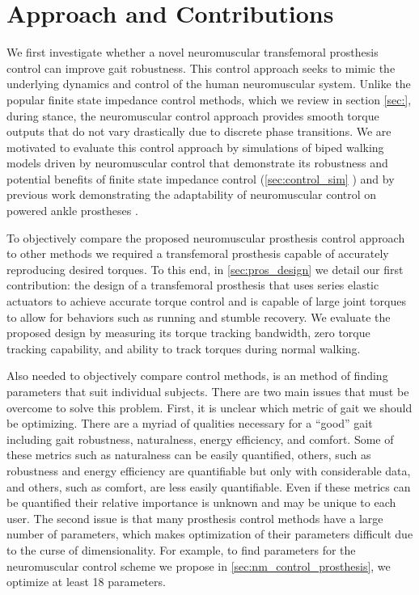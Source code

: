 \section{Approach and Contributions}\label{sec:intro_approach_contrib} 

We first investigate whether a novel neuromuscular transfemoral prosthesis
control can improve gait robustness. This control approach seeks to mimic the
underlying dynamics and control of the human neuromuscular system. Unlike the
popular finite state impedance control methods, which we review in section
\cref{sec:}, during stance, the neuromuscular control approach provides smooth
torque outputs that do not vary drastically due to discrete phase transitions.
We are motivated to evaluate this control approach by simulations of biped
walking models driven by neuromuscular control that demonstrate its robustness
\citep{song2013integration,song2015neural} and potential benefits of finite
state impedance control (\cref{sec:control_sim} \citep{thatte2016toward}) and by
previous work demonstrating the adaptability of neuromuscular control on powered
ankle prostheses \citep{eilenberg2010control,markowitz2011speed}.

To objectively compare the proposed neuromuscular prosthesis control approach to
other methods we required a transfemoral prosthesis capable of accurately
reproducing desired torques. To this end, in \cref{sec:pros_design} we detail
our first contribution: the design of a transfemoral prosthesis that uses series
elastic actuators to achieve accurate torque control and is capable of large
joint torques to allow for behaviors such as running and stumble recovery.  We
evaluate the proposed design by measuring its torque tracking bandwidth, zero
torque tracking capability, and ability to track torques during normal walking.

Also needed to objectively compare control methods, is an method of finding
parameters that suit individual subjects. There are two main issues that must be
overcome to solve this problem. First, it is unclear which metric of gait we
should be optimizing. There are a myriad of qualities necessary for a ``good''
gait including gait robustness, naturalness, energy efficiency, and comfort.
Some of these metrics such as naturalness can be easily quantified, others, such
as robustness and energy efficiency are quantifiable but only with considerable
data, and others, such as comfort, are less easily quantifiable. Even if these
metrics can be quantified their relative importance is unknown and may be unique
to each user. The second issue is that many prosthesis control methods have a
large number of parameters, which makes optimization of their parameters
difficult due to the curse of dimensionality. For example, to find parameters
for the neuromuscular control scheme we propose in 
\cref{sec:nm_control_prosthesis}, we optimize at least 18 parameters.

